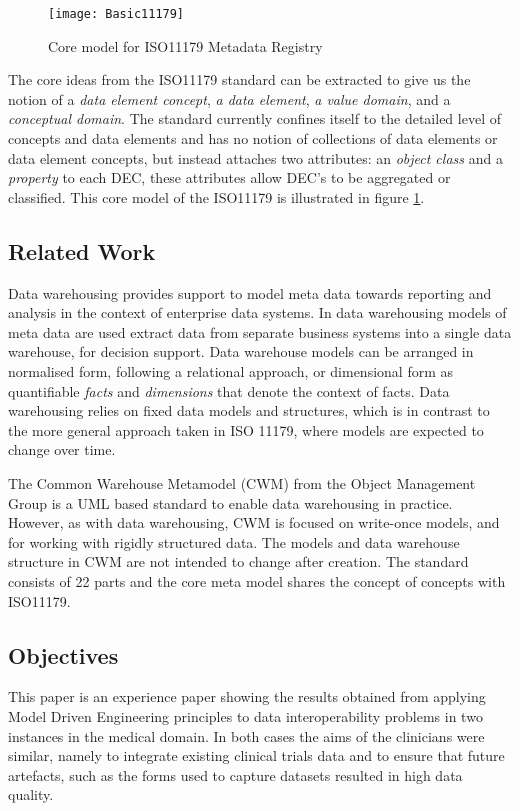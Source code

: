 \begin{figure}[here]
	\texttt{[image: Basic11179]}
	\caption{Core model for ISO11179 Metadata Registry} 
	\label{fig:basicMDR}
\end{figure}

The core ideas from the ISO11179 standard can be extracted to give us the notion of a \emph{data element concept}, \emph{a data element}, \emph{a value domain}, and a \emph{conceptual domain}. The standard currently confines itself to the detailed level of concepts and data elements and has no notion of collections of data elements or data element concepts, but instead attaches two attributes: an \emph{object class} and a \emph{property} to each DEC, these attributes allow DEC's to be aggregated or classified. This core model of the ISO11179 is illustrated in figure \ref{fig:basicMDR}.





\subsection{Related Work}

Data warehousing provides support to model meta data towards reporting and analysis in the context of enterprise data systems. In data warehousing models of meta data are used extract data from separate business systems into a single data warehouse, for decision support. Data warehouse models can be arranged in normalised form, following a relational approach, or dimensional form as quantifiable \emph{facts} and \emph{dimensions} that denote the context of facts. Data warehousing relies on fixed data models and structures, which is in contrast to the more general approach taken in ISO 11179, where models are expected to change over time. 

The Common Warehouse Metamodel (CWM) from the Object Management Group is a UML based standard to enable data warehousing in practice. However, as with data warehousing, CWM is focused on write-once models, and for working with rigidly structured data. The models and data warehouse structure in CWM are not intended to change after creation. The standard consists of 22 parts and the core meta model shares the concept of concepts with ISO11179.



\subsection{Objectives}
This paper is an experience paper showing the results obtained from applying Model Driven Engineering principles to data interoperability problems in two instances in the medical domain. In both cases the aims of the clinicians were similar, namely to integrate existing clinical trials data and to ensure that future artefacts, such as the forms used to capture datasets resulted in high data quality. 

